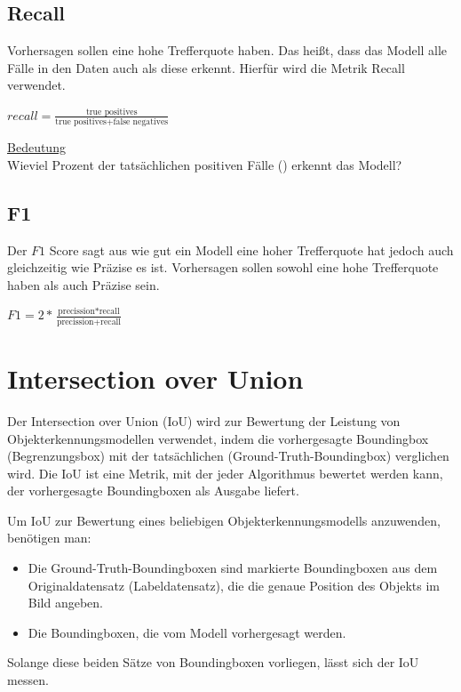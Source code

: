             
        \subsection{Recall}
            Vorhersagen sollen eine hohe Trefferquote haben. Das heißt, dass das Modell alle  Fälle in den
            Daten auch als diese erkennt. Hierfür wird die Metrik Recall verwendet.\newline
            \begin{center}  
                \large$recall = \frac{\text{true positives}}{\text{true positives} + \text{false negatives}}$\\
            \end{center}
            \underline{Bedeutung}\\
            Wieviel Prozent der tatsächlichen positiven Fälle () erkennt das Modell?
            
        \subsection{F1}
            Der $F1$ Score sagt aus wie gut ein Modell eine hoher Trefferquote hat jedoch auch gleichzeitig wie Präzise es
            ist. Vorhersagen sollen sowohl eine hohe Trefferquote haben als auch Präzise sein.\newline
            \begin{center} 
                \large$F1 = 2 * \frac{\text{precission} * \text{recall}}{\text{precission} + \text{recall}}$\\
            \end{center}
            
\newpage
    \section{Intersection over Union}
        \cite{iou, iou_paper, iou_2} Der Intersection over Union (IoU) wird zur Bewertung der Leistung von Objekterkennungsmodellen verwendet, indem die vorhergesagte Boundingbox (Begrenzungsbox) mit der tatsächlichen (Ground-Truth-Boundingbox) verglichen wird.
        Die IoU ist eine Metrik, mit der jeder Algorithmus bewertet werden kann, der vorhergesagte Boundingboxen als Ausgabe liefert.

        Um IoU zur Bewertung eines beliebigen Objekterkennungsmodells anzuwenden, benötigen man:

        \begin{itemize}
            \item Die Ground-Truth-Boundingboxen sind markierte Boundingboxen aus dem Originaldatensatz (Labeldatensatz), die die genaue Position des Objekts im Bild angeben.
            \item Die Boundingboxen, die vom Modell vorhergesagt werden.
        \end{itemize}
        Solange diese beiden Sätze von Boundingboxen vorliegen, lässt sich der IoU messen.

